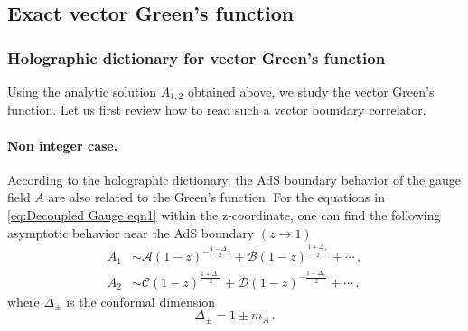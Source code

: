 \documentclass[11pt,a4paper]{article}
\newcommand{\ra}{\rightarrow}
\begin{document}
\subsection{Exact vector Green's function} \label{Exact Green's function in spin 1}
\subsubsection{Holographic dictionary for vector Green's function}
Using the analytic solution $A_{1,2}$ obtained above, we study the vector Green's function. Let us first review how to read such a vector boundary correlator.
\paragraph{Non integer case.}
According to the holographic dictionary, the AdS boundary behavior of the gauge field $A$ are also related to the Green's function. For the equations in \eqref{eq:Decoupled Gauge eqn1} within the z-coordinate, one can find the following asymptotic behavior near the AdS boundary $(z\ra1)$
\begin{equation}
\begin{aligned} \label{eq:Gauge Non-Integer boundary behavior 12}
    A_1 &\sim \mathcal{A}(1-z)^{-\frac{1-\Delta_-}{2}} + \mathcal{B} (1-z)^{\frac{1+\Delta_+}{2}} + \cdots\,,\\
    A_2 &\sim \mathcal{C}(1-z)^{\frac{1+\Delta_-}{2}} + \mathcal{D} (1-z)^{-\frac{1-\Delta_+}{2}} + \cdots\,.
\end{aligned}
\end{equation}
where $\Delta_{\pm}$ is the conformal dimension
\begin{equation} \label{SDR Vector}
    \Delta_{\pm} = 1 \pm m_A\,.
\end{equation}
\end{document}

